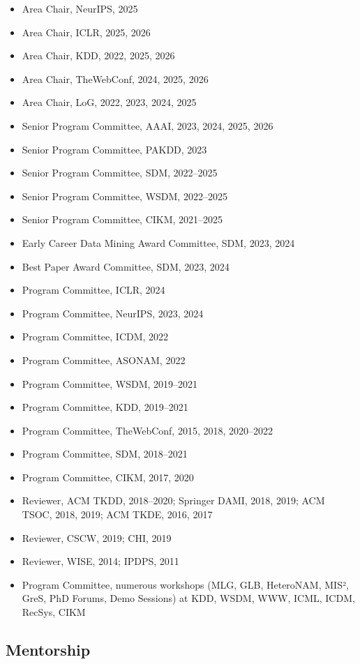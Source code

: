 \documentclass{article}
\begin{document}
\begin{itemize}
\item Area Chair, NeurIPS, 2025
\item Area Chair, ICLR, 2025, 2026
\item Area Chair, KDD, 2022, 2025, 2026
\item Area Chair, TheWebConf, 2024, 2025, 2026
\item Area Chair, LoG, 2022, 2023, 2024, 2025
\item Senior Program Committee, AAAI, 2023, 2024, 2025, 2026
\item Senior Program Committee, PAKDD, 2023
\item Senior Program Committee, SDM, 2022–2025
\item Senior Program Committee, WSDM, 2022–2025
\item Senior Program Committee, CIKM, 2021–2025
\item Early Career Data Mining Award Committee, SDM, 2023, 2024
\item Best Paper Award Committee, SDM, 2023, 2024
\item Program Committee, ICLR, 2024
\item Program Committee, NeurIPS, 2023, 2024
\item Program Committee, ICDM, 2022
\item Program Committee, ASONAM, 2022
\item Program Committee, WSDM, 2019–2021
\item Program Committee, KDD, 2019–2021
\item Program Committee, TheWebConf, 2015, 2018, 2020–2022
\item Program Committee, SDM, 2018–2021
\item Program Committee, CIKM, 2017, 2020
\item Reviewer, ACM TKDD, 2018–2020; Springer DAMI, 2018, 2019; ACM TSOC, 2018, 2019; ACM TKDE, 2016, 2017
\item Reviewer, CSCW, 2019; CHI, 2019
\item Reviewer, WISE, 2014; IPDPS, 2011
\item Program Committee, numerous workshops (MLG, GLB, HeteroNAM, MIS², GreS, PhD Forums, Demo Sessions) at KDD, WSDM, WWW, ICML, ICDM, RecSys, CIKM
\end{itemize}

\subsection*{\bf {Mentorship}}
\end{document}
